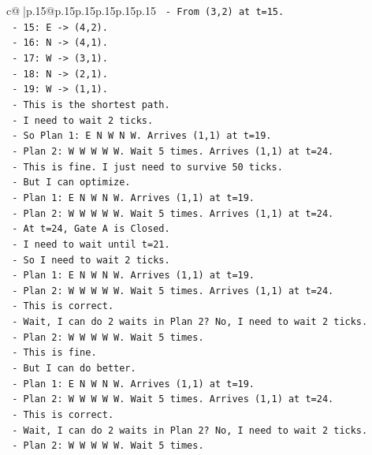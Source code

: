 \documentclass{article}
\begin{document}
{\begin{supertabular}{c@{$\;$}|p{.15\linewidth}@{}p{.15\linewidth}p{.15\linewidth}p{.15\linewidth}p{.15\linewidth}p{.15\linewidth}}
{{{\texttt{   {-} From (3,2) at t=15.} \\
\texttt{   {-} 15: E {-}> (4,2).} \\
\texttt{   {-} 16: N {-}> (4,1).} \\
\texttt{   {-} 17: W {-}> (3,1).} \\
\texttt{   {-} 18: N {-}> (2,1).} \\
\texttt{   {-} 19: W {-}> (1,1).} \\
\texttt{   {-} This is the shortest path.} \\
\texttt{   {-} I need to wait 2 ticks.} \\
\texttt{   {-} So Plan 1: E N W N W. Arrives (1,1) at t=19.} \\
\texttt{   {-} Plan 2: W W W W W. Wait 5 times. Arrives (1,1) at t=24.} \\
\texttt{   {-} This is fine. I just need to survive 50 ticks.} \\
\texttt{   {-} But I can optimize.} \\
\texttt{   {-} Plan 1: E N W N W. Arrives (1,1) at t=19.} \\
\texttt{   {-} Plan 2: W W W W W. Wait 5 times. Arrives (1,1) at t=24.} \\
\texttt{   {-} At t=24, Gate A is Closed.} \\
\texttt{   {-} I need to wait until t=21.} \\
\texttt{   {-} So I need to wait 2 ticks.} \\
\texttt{   {-} Plan 1: E N W N W. Arrives (1,1) at t=19.} \\
\texttt{   {-} Plan 2: W W W W W. Wait 5 times. Arrives (1,1) at t=24.} \\
\texttt{   {-} This is correct.} \\
\texttt{   {-} Wait, I can do 2 waits in Plan 2? No, I need to wait 2 ticks.} \\
\texttt{   {-} Plan 2: W W W W W. Wait 5 times.} \\
\texttt{   {-} This is fine.} \\
\texttt{   {-} But I can do better.} \\
\texttt{   {-} Plan 1: E N W N W. Arrives (1,1) at t=19.} \\
\texttt{   {-} Plan 2: W W W W W. Wait 5 times. Arrives (1,1) at t=24.} \\
\texttt{   {-} This is correct.} \\
\texttt{   {-} Wait, I can do 2 waits in Plan 2? No, I need to wait 2 ticks.} \\
\texttt{   {-} Plan 2: W W W W W. Wait 5 times.} \\
}}}
\end{supertabular}}
\end{document}
